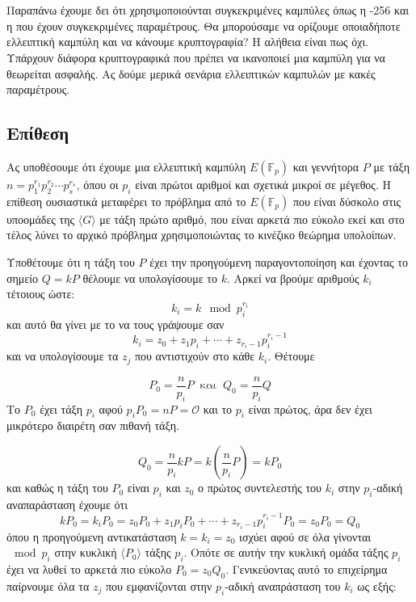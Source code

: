 \documentclass[oneside,a4paper]{article}
\begin{document}
\pagebreak
\section{}

Παραπάνω έχουμε δει ότι χρησιμοποιούνται συγκεκριμένες καμπύλες όπως η -256 και η  που έχουν συγκεκριμένες παραμέτρους. Θα μπορούσαμε να ορίζουμε οποιαδήποτε ελλειπτική καμπύλη και να κάνουμε κρυπτογραφία? Η αλήθεια είναι πως όχι. Υπάρχουν διάφορα κρυπτογραφικά  που πρέπει να ικανοποιεί μια καμπύλη για να θεωρείται ασφαλής. Ας δούμε μερικά σενάρια ελλειπτικών καμπυλών με κακές παραμέτρους.

\subsection{Επίθεση }

Ας υποθέσουμε ότι έχουμε μια ελλειπτική καμπύλη $E(\mathbb{F}_p)$ και γεννήτορα $P$ με τάξη $n=p_1^{r_1} p_2^{r_2} \cdots p_s^{r_s}$, όπου οι $p_i$ είναι πρώτοι αριθμοί και σχετικά μικροί σε μέγεθος. Η επίθεση  ουσιαστικά μεταφέρει το πρόβλημα  από το $E(\mathbb{F}_p)$ που είναι δύσκολο στις υποομάδες της $\langle G \rangle$ με τάξη πρώτο αριθμό, που είναι αρκετά πιο εύκολο εκεί και στο τέλος λύνει το αρχικό πρόβλημα χρησιμοποιώντας το κινέζικο θεώρημα υπολοίπων.

Υποθέτουμε ότι η τάξη του $P$ έχει την προηγούμενη παραγοντοποίηση και έχοντας το σημείο $Q = kP$ θέλουμε να υπολογίσουμε το $k$. Αρκεί να βρούμε αριθμούς $k_i$ τέτοιους ώστε:
$$k_i =  k \mod p_i^{r_i}$$ και αυτό θα γίνει με το να τους γράψουμε σαν 
$$k_i = z_0 + z_1 p_i + \cdots + z_{r_i -1} p_i^{r_i - 1}$$ και να υπολογίσουμε τα $z_j$ που αντιστιχούν στο κάθε $k_i$. Θέτουμε

$$P_0 = \frac{n}{p_i}P \ \text{ και } \ Q_0 = \frac{n}{p_i} Q$$ Το $P_0$ έχει τάξη $p_i$ αφού $p_i P_0 = n P = \mathcal{O}$ και το $p_i$ είναι πρώτος, άρα δεν έχει μικρότερο διαιρέτη σαν πιθανή τάξη.

$$Q_0 = \frac{n}{p_i} kP = k\left( \frac{n}{p_i} P \right) = k P_0$$ και καθώς η τάξη του $P_0$ είναι $p_i$ και $z_0$ ο πρώτος συντελεστής του $k_i$ στην $p_i$-αδική αναπαράσταση έχουμε ότι
$$k P_0 = k_i P_0 =  z_0 P_0 + z_1 p_i P_0 + \cdots + z_{r_i-1}p_i^{r_i-1}P_0 = z_0 P_0 = Q_0$$ όπου η προηγούμενη αντικατάσταση $k = k_i = z_0$ ισχύει αφού σε όλα γίνονται $\mod p_i$ στην κυκλική $\langle P_0 \rangle$ τάξης $p_i$. Οπότε σε αυτήν την κυκλική ομάδα τάξης $p_i$ έχει να λυθεί το αρκετά πιο εύκολο  $P_0 = z_0 Q_0$. Γενικεύοντας αυτό το επιχείρημα παίρνουμε όλα τα $z_j$ που εμφανίζονται στην $p_i$-αδική αναπράσταση του $k_i$ ως εξής:
\end{document}
